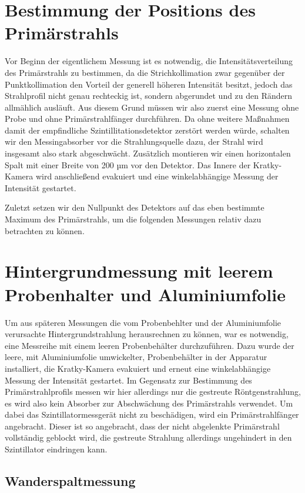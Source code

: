 \documentclass[bigchapter,colorback,accentcolor=tud4b,linedtoc,11pt]{tudreport}
\begin{document}
\section{Bestimmung der Positions des Primärstrahls}

Vor Beginn der eigentlichem Messung ist es notwendig, die Intensitätsverteilung des Primärstrahls zu bestimmen, da die Strichkollimation zwar gegenüber der Punktkollimation den Vorteil der generell höheren Intensität besitzt, jedoch das Strahlprofil nicht genau rechteckig ist, sondern abgerundet und zu den Rändern allmählich ausläuft. Aus diesem Grund müssen wir also zuerst eine Messung ohne Probe und ohne Primärstrahlfänger durchführen. Da ohne weitere Maßnahmen damit der empfindliche Szintillitationsdetektor zerstört werden würde, schalten wir den Messingabsorber vor die Strahlungsquelle dazu, der Strahl wird insgesamt also stark abgeschwächt. Zusätzlich montieren wir einen horizontalen Spalt mit einer Breite von 200 µm vor den Detektor. Das Innere der Kratky-Kamera wird anschließend evakuiert und eine winkelabhängige Messung der Intensität gestartet. 

Zuletzt setzen wir den Nullpunkt des Detektors auf das eben bestimmte Maximum des Primärstrahls, um die folgenden Messungen relativ dazu betrachten zu können.

\section{Hintergrundmessung mit leerem Probenhalter und Aluminiumfolie}

Um aus späteren Messungen die vom Probenbehlter und der Aluminiumfolie verursachte Hintergrundstrahlung herausrechnen zu können, war es notwendig, eine Messreihe mit einem leeren Probenbehälter durchzuführen. Dazu wurde der leere, mit Aluminiumfolie umwickelter, Probenbehälter in der Apparatur installiert, die Kratky-Kamera evakuiert und erneut eine winkelabhängige Messung der Intensität gestartet. Im Gegensatz zur Bestimmung des Primärstrahlprofils messen wir hier allerdings nur die gestreute Röntgenstrahlung, es wird also kein Absorber zur Abschwächung des Primärstrahls verwendet. Um dabei das Szintillatormessgerät nicht zu beschädigen, wird ein Primärstrahlfänger angebracht. Dieser ist so angebracht, dass der nicht abgelenkte Primärstrahl vollständig geblockt wird, die gestreute Strahlung allerdings ungehindert in den Szintillator eindringen kann.

\subsection{Wanderspaltmessung}
\end{document}
